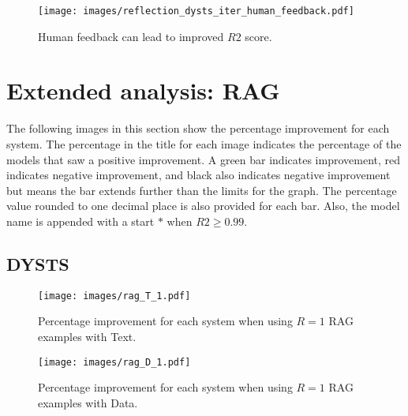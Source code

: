 \documentclass{article}
\begin{document}


\begin{figure}[H]
    \texttt{[image: images/reflection\_dysts\_iter\_human\_feedback.pdf]}
    \caption{Human feedback can lead to improved $R2$ score.}
    \label{fig:human-feedback}
\end{figure}


\newpage

\section{Extended analysis: RAG}

The following images in this section show the percentage improvement for each system. 
The percentage in the title for each image indicates the percentage of the models that saw a positive improvement. 
A green bar indicates improvement, red indicates negative improvement, and black also indicates negative improvement but means the bar extends further than the limits for the graph. 
The percentage value rounded to one decimal place is also provided for each bar. 
Also, the model name is appended with a start $*$ when $R2 \geq 0.99$.

\subsection{DYSTS}

\begin{figure}[H]
    \centering
    \texttt{[image: images/rag\_T\_1.pdf]}
    \caption{Percentage improvement for each system when using $R=1$ RAG examples with Text.}
    \label{fig:rag-t-1}
\end{figure}

\begin{figure}[H]
    \centering
    \texttt{[image: images/rag\_D\_1.pdf]}
    \caption{Percentage improvement for each system when using $R=1$ RAG examples with Data.}
    \label{fig:rag-d-1}
\end{figure}
\end{document}
